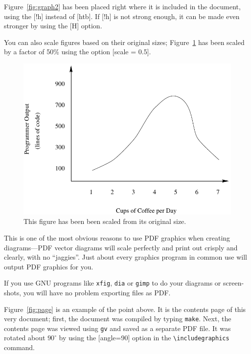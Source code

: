 Figure~\ref{fig:graph2} has been placed right where it is included in
the document, using the [!h] instead of [htb].  If [!h] is not strong
enough, it can be made even stronger by using the [H] option.

You can also scale figures based on their original sizes;
Figure~\ref{fig:graph3} has been scaled by a factor of 50\% using the
option [scale = 0.5].

\begin{figure}[!h]
\begin{center}
\includegraphics[scale = 0.5]{graph1.pdf}
\caption[A scaled example of a floating figure.]{This figure has been
been scaled from its original size.}
\label{fig:graph3}
\end{center}
\end{figure}

This is one of the most obvious reasons to use PDF
graphics when creating diagrams---PDF vector diagrams will scale
perfectly and print out crisply and 
clearly, with no ``jaggies''.  Just about every graphics program in
common use will output PDF graphics for you.

If you use GNU programs like {\tt xfig}, {\tt dia} or {\tt gimp} to do
your diagrams or screen-shots, you will have no problem exporting files as
PDF.

Figure~\ref{fig:page} is an example of the point above.  It is
the contents page of this very document; first, the document was
compiled by typing {\tt make}.  Next, the contents page was viewed
using {\tt gv} and saved as a separate PDF file.  It was
rotated about \(90^\circ\) by using the [angle=90] option in the
\verb|\includegraphics| command.

